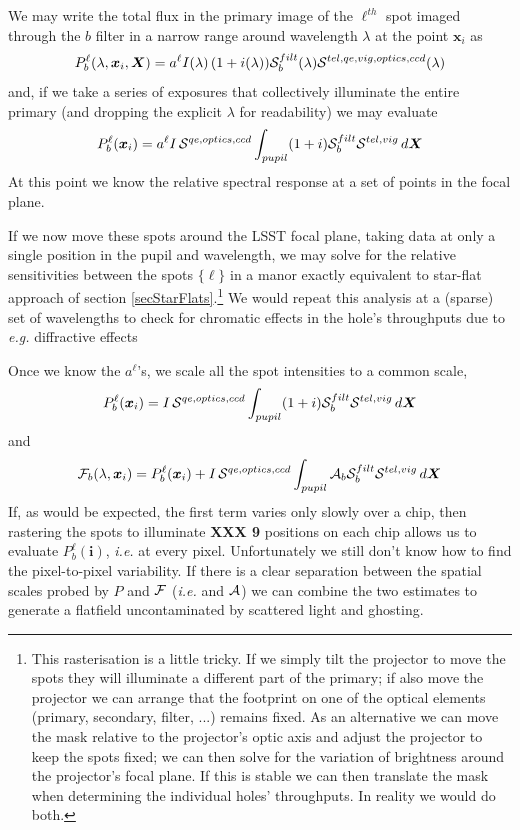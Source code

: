 \documentclass[12pt]{article}
\newcommand{\eg}{\textit{e.g.}\xspace}
\newcommand{\ie}{\textit{i.e.}\xspace}
\newcommand{\ib}{{\boldsymbol i}}
\newcommand{\Xb}{{\boldsymbol X}}
\newcommand{\xb}{{\boldsymbol x}}
\newcommand{\Flat}{{\cal F}}
\newcommand{\additive}{{\cal A}}
\newcommand{\qe}{{\cal S}}
\newcommand{\XXX}[1]{\textbf{XXX #1}\xspace}
\begin{document}
We may write the total flux in the primary image of the $\ell^{th}$ spot imaged through the $b$ filter in a narrow
range around wavelength $\lambda$ at the point $\xb_i$ as
$$
P_b^\ell(\lambda, \xb_i, \Xb) = a^\ell I(\lambda)\, (1 + i(\lambda)) \qe_b^{filt}(\lambda)
 \qe^{tel, qe, vig, optics, ccd}(\lambda)
$$
and, if we take a series of exposures that collectively illuminate the entire primary (and dropping
the explicit $\lambda$ for readability) we may evaluate
$$
P_b^\ell(\xb_i) = a^\ell I\, \qe^{qe, optics, ccd}
                   \int_{pupil} (1 + i) \qe_b^{filt} \qe^{tel, vig}\,d\Xb
$$
At this point we know the relative spectral response at a set of points in the focal plane.                   

If we now move these spots around the LSST focal plane, taking data at only a single position in the pupil and
wavelength, we may solve for the relative sensitivities between the spots $\{\ell\}$ in a manor exactly
equivalent to star-flat approach of section \ref{secStarFlats}.\footnote{ This rasterisation is a little tricky.  If
  we simply tilt the projector to move the spots they will illuminate a different part of the primary; if also
  move the projector we can arrange that the footprint on one of the optical elements (primary, secondary,
  filter, ...) remains fixed.  As an alternative we can move the mask relative to the projector's optic axis
  and adjust the projector to keep the spots fixed; we can then solve for the variation of brightness around
  the projector's focal plane.  If this is stable we can then translate the mask when determining the
  individual holes' throughputs.  In reality we would do both.  }
We would repeat this analysis at a (sparse) set of wavelengths to check for chromatic effects in the hole's
throughputs due to \eg diffractive effects

Once we know the $a^\ell$'s, we scale all the spot intensities to a common scale,
$$
P_b^\ell(\xb_i) = I\, \qe^{qe, optics, ccd} \int_{pupil} (1 + i) \qe_b^{filt} \qe^{tel, vig}\,d\Xb
$$
and
$$
\Flat_b(\lambda, \xb_i) = P_b^\ell(\xb_i) + I\, \qe^{qe, optics, ccd}
                              \int_{pupil} \additive_b \qe_b^{filt} \qe^{tel, vig}\, d\Xb
$$
If, as would be expected, the first term varies only slowly over a chip, then rastering the spots to
illuminate \XXX{9} positions on each chip allows us to evaluate $P_b^\ell(\ib)$, \ie at every pixel.
Unfortunately we still don't know how to find the pixel-to-pixel variability.  If there is a clear
separation between the spatial scales probed by $P$ and $\Flat$ (\ie and $\additive$) we can combine
the two estimates to generate a flatfield uncontaminated by scattered light and ghosting.
\end{document}
